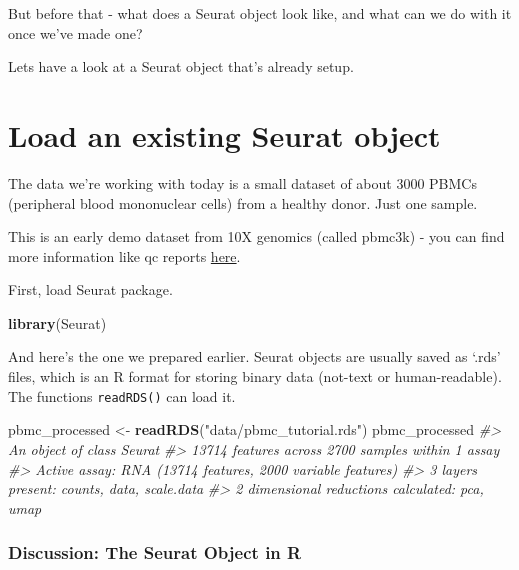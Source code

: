 \documentclass[
]{book}
\newenvironment{Shaded}{\begin{snugshade}}{\end{snugshade}}
\newcommand{\CommentTok}[1]{\textcolor[rgb]{0.56,0.35,0.01}{\textit{#1}}}
\newcommand{\FunctionTok}[1]{\textcolor[rgb]{0.13,0.29,0.53}{\textbf{#1}}}
\newcommand{\NormalTok}[1]{#1}
\newcommand{\OtherTok}[1]{\textcolor[rgb]{0.56,0.35,0.01}{#1}}
\newcommand{\StringTok}[1]{\textcolor[rgb]{0.31,0.60,0.02}{#1}}
\begin{document}
But before that - what does a Seurat object look like, and what can we do with it once we've made one?

Lets have a look at a Seurat object that's already setup.

\section{Load an existing Seurat object}\label{load-an-existing-seurat-object}

The data we're working with today is a small dataset of about 3000 PBMCs (peripheral blood mononuclear cells) from a healthy donor. Just one sample.

This is an early demo dataset from 10X genomics (called pbmc3k) - you can find more information like qc reports \href{https://www.10xgenomics.com/resources/datasets/3-k-pbm-cs-from-a-healthy-donor-1-standard-1-1-0}{here}.

First, load Seurat package.

\begin{Shaded}
\begin{Highlighting}[]
\FunctionTok{library}\NormalTok{(Seurat)}
\end{Highlighting}
\end{Shaded}

And here's the one we prepared earlier. Seurat objects are usually saved as `.rds' files, which is an R format for storing binary data (not-text or human-readable). The functions \texttt{readRDS()} can load it.

\begin{Shaded}
\begin{Highlighting}[]
\NormalTok{pbmc\_processed }\OtherTok{\textless{}{-}} \FunctionTok{readRDS}\NormalTok{(}\StringTok{"data/pbmc\_tutorial.rds"}\NormalTok{)}
\NormalTok{pbmc\_processed}
\CommentTok{\#\textgreater{} An object of class Seurat }
\CommentTok{\#\textgreater{} 13714 features across 2700 samples within 1 assay }
\CommentTok{\#\textgreater{} Active assay: RNA (13714 features, 2000 variable features)}
\CommentTok{\#\textgreater{}  3 layers present: counts, data, scale.data}
\CommentTok{\#\textgreater{}  2 dimensional reductions calculated: pca, umap}
\end{Highlighting}
\end{Shaded}

\subsubsection*{Discussion: The Seurat Object in R}\label{discussion-the-seurat-object-in-r}
\end{document}
